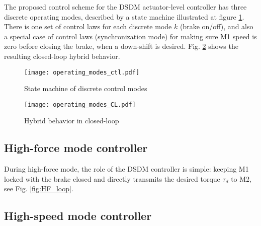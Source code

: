 The proposed control scheme for the DSDM actuator-level controller has three discrete operating modes, described by a state machine illustrated at figure \ref{fig:automaticflow}. There is one set of control laws for each discrete mode $k$ (brake on/off), and also a special case of control laws (synchronization mode) for making sure M1 speed is zero before closing the brake, when a down-shift is desired. Fig. \ref{fig:hybrid_closedloop} shows the resulting closed-loop hybrid behavior.

\begin{figure}[H]
	\centering
		\texttt{[image: operating\_modes\_ctl.pdf]}
	\caption{State machine of discrete control modes}
	\label{fig:automaticflow}
\end{figure}

\begin{figure}[H]
	\centering
		\texttt{[image: operating\_modes\_CL.pdf]}
	\caption{Hybrid behavior in closed-loop}
	\label{fig:hybrid_closedloop}
\end{figure}



\subsection{High-force mode controller}

During high-force mode, the role of the DSDM controller is simple: keeping M1 locked with the brake closed and directly transmits the desired torque $\tau_d$ to M2, see Fig. \ref{fig:HF_loop}. 




\subsection{High-speed mode controller}


